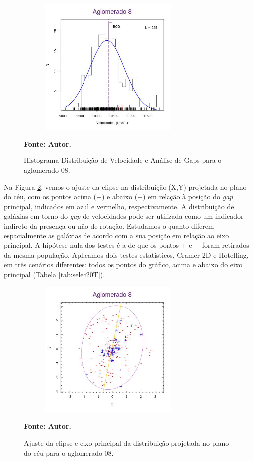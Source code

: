 \begin{figure}[H] %
\vspace{-2pt}
\begin{center}
\includegraphics[height=6.7cm,width=9cm]{04-figuras/selec20gap}%
\caption{Histograma Distribuição de Velocidade e Análise de Gaps para o aglomerado 08.}
\textbf{Fonte: Autor.}
\label{selec20gap}%
\end{center}
\end{figure}

Na Figura \ref{selec20ellipse}, vemos o ajuste da elipse na distribuição (X,Y) projetada no plano do céu, com os pontos acima ($+$) e abaixo ($-$) em relação à posição do \textit{gap} principal, indicados em azul e vermelho, respectivamente. A distribuição de galáxias em torno do \textit{gap} de velocidades pode ser utilizada como um indicador indireto da presença ou não de rotação. Estudamos o quanto diferem espacialmente as galáxias de acordo com a sua posição em relação ao eixo principal. A hipótese nula dos testes é a de que os pontos $+$ e $-$ foram retirados da mesma população. Aplicamos dois testes estatísticos, Cramer 2D e Hotelling, em três cenários diferentes: todos os pontos do gráfico, acima e abaixo do eixo principal (Tabela \ref{tab:selec20T}). 

\begin{figure}[H] %
\vspace{-2pt}
\begin{center}
\includegraphics[height=6.7cm,width=9cm]{04-figuras/selec20ellipse}%
\caption{Ajuste da elipse e eixo principal da distribuição projetada no plano do céu para o aglomerado 08.}
\textbf{Fonte: Autor.}
\label{selec20ellipse}%
\end{center}
\end{figure}

